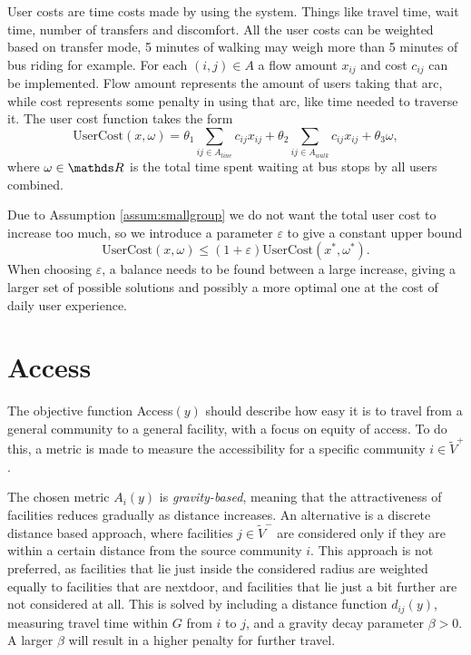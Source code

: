 User costs are time costs made by using the system. Things like travel time, wait time, number of transfers and discomfort. All the user costs can be weighted based on transfer mode, 5 minutes of walking may weigh more than 5 minutes of bus riding for example. For each $(i,j)\in A$ a flow amount $x_{ij}$ and cost $c_{ij}$ can be implemented. Flow amount represents the amount of users taking that arc, while cost represents some penalty in using that arc, like time needed to traverse it. The user cost function takes the form
\begin{equation*}
    \text{UserCost}(x, \omega) = \theta_1 \sum_{ij\in A_{line}} c_{ij}x_{ij}
    +\theta_2 \sum_{ij\in A_{walk}} c_{ij}x_{ij}
    +\theta_3 \omega,
\end{equation*}
where $\omega\in \R$ is the total time spent waiting at bus stops by all users combined.

Due to Assumption \ref{assum:smallgroup} we do not want the total user cost to increase too much, so we introduce a parameter $\varepsilon$ to give a constant upper bound
\begin{equation*}
    \text{UserCost}(x, \omega) \leq (1+\varepsilon)\text{UserCost}(x^*, \omega^*).
\end{equation*}
When choosing $\varepsilon$, a balance needs to be found between a large increase, giving a larger set of possible solutions and possibly a more optimal one at the cost of daily user experience.

\section{Access}\label{sec:access}
The objective function Access$(y)$ should describe how easy it is to travel from a general community to a general facility, with a focus on equity of access. To do this, a metric is made to measure the accessibility for a specific community $i\in \tilde V^+$.

The chosen metric $A_i(y)$ is \emph{gravity-based}, meaning that the attractiveness of facilities reduces gradually as distance increases. An alternative is a discrete distance based approach, where facilities $j\in \tilde V^-$ are considered only if they are within a certain distance from the source community $i$. This approach is not preferred, as facilities that lie just inside the considered radius are weighted equally to facilities that are nextdoor, and facilities that lie just a bit further are not considered at all. This is solved by including a distance function $d_{ij}(y)$, measuring travel time within $G$ from $i$ to $j$, and a gravity decay parameter $\beta >0$. A larger $\beta$ will result in a higher penalty for further travel. %

